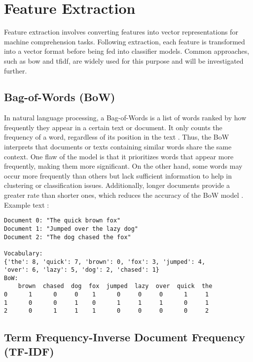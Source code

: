 \section{Feature Extraction}

Feature extraction involves converting features into vector representations for machine comprehension tasks. Following extraction, each feature is transformed into a vector format before being fed into classifier models. Common approaches, such as \ac{bow} and \ac{tfidf}, are widely used for this purpose and will be investigated further.

\subsection{Bag-of-Words (BoW)}

In natural language processing, a Bag-of-Words is a list of words ranked by how frequently they appear in a certain text or document. It only counts the frequency of a word, regardless of its position in the text \citep{tabassum_survey_2020}. Thus, the BoW interprets that documents or texts containing similar words share the same context. One flaw of the model is that it prioritizes words that appear more frequently, making them more significant. On the other hand, some words may occur more frequently than others but lack sufficient information to help in clustering or classification issues. Additionally, longer documents provide a greater rate than shorter ones, which reduces the accuracy of the BoW model \citep{tabassum_survey_2020}. Example text \citep{openai_gpt3}:

\begin{verbatim}
Document 0: "The quick brown fox"
Document 1: "Jumped over the lazy dog"
Document 2: "The dog chased the fox"

Vocabulary: 
{'the': 8, 'quick': 7, 'brown': 0, 'fox': 3, 'jumped': 4,
'over': 6, 'lazy': 5, 'dog': 2, 'chased': 1}
BoW:
    brown  chased  dog  fox  jumped  lazy  over  quick  the
0      1      0     0    1      0     0     0      1     1
1      0      0     1    0      1     1     1      0     1
2      0      1     1    1      0     0     0      0     2
\end{verbatim}


\subsection{Term Frequency-Inverse Document Frequency (TF-IDF)}

